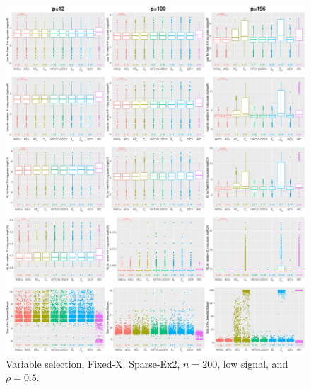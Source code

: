 \begin{figure}[!ht]
\centering
\includegraphics[width=\textwidth]{figures/supplement/fixedx/subset_selection/Sparse-Ex2_n200_lsnr_rho05.eps}
\caption{Variable selection, Fixed-X, Sparse-Ex2, $n=200$, low signal, and $\rho=0.5$.}
\end{figure}
\clearpage

